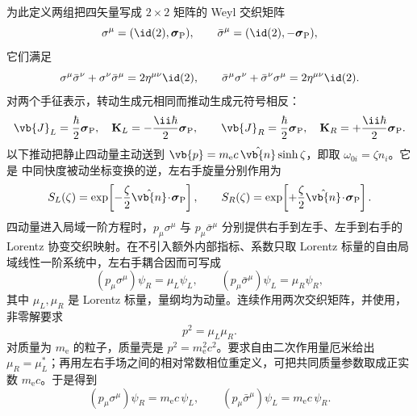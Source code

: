 为此定义两组把四矢量写成 $2\times2$ 矩阵的 Weyl 交织矩阵
\begin{equation*}
 \sigma^\mu=(\id(2),\boldsymbol\sigma_{\rm P}),
 \qquad
 \bar\sigma^\mu=(\id(2),-\boldsymbol\sigma_{\rm P}),
\end{equation*}
它们满足
\begin{equation}
 \sigma^\mu\bar\sigma^\nu+\sigma^\nu\bar\sigma^\mu
 =2\eta^{\mu\nu}\id(2),
 \qquad
 \bar\sigma^\mu\sigma^\nu+\bar\sigma^\nu\sigma^\mu
 =2\eta^{\mu\nu}\id(2).
 \label{eq:sigmabar-identity}
\end{equation}
对两个手征表示，转动生成元相同而推动生成元符号相反：
\begin{equation}
 \vb{J}_L=\frac{\hbar}{2}\boldsymbol\sigma_{\rm P},
 \quad
 \mathbf K_L=-\frac{\ii\hbar}{2}\boldsymbol\sigma_{\rm P},
 \qquad
 \vb{J}_R=\frac{\hbar}{2}\boldsymbol\sigma_{\rm P},
 \quad
 \mathbf K_R=+\frac{\ii\hbar}{2}\boldsymbol\sigma_{\rm P}.
 \label{eq:weyl-generators}
\end{equation}
以下推动把静止四动量主动送到 $\vb{p}=m_{\mathrm e}c\,\hat{\vb{n}}\sinh\zeta$，即取 $\omega_{0i}=\zeta n_i$。它是 中同快度被动坐标变换的逆，左右手旋量分别作用为
\begin{equation}
 S_L(\zeta)=\exp\!\left[-\frac{\zeta}{2}
 \hat{\vb{n}}\!\cdot\!\boldsymbol\sigma_{\rm P}\right],
 \qquad
 S_R(\zeta)=\exp\!\left[+\frac{\zeta}{2}
 \hat{\vb{n}}\!\cdot\!\boldsymbol\sigma_{\rm P}\right].
 \label{eq:weyl-boost-r7}
\end{equation}
四动量进入局域一阶方程时，$p_\mu\sigma^\mu$ 与 $p_\mu\bar\sigma^\mu$ 分别提供右手到左手、左手到右手的 Lorentz 协变交织映射。在不引入额外内部指标、系数只取 Lorentz 标量的自由局域线性一阶系统中，左右手耦合因而可写成
\begin{equation*}
 (p_\mu\sigma^\mu)\psi_R=\mu_L\psi_L,
 \qquad
 (p_\mu\bar\sigma^\mu)\psi_L=\mu_R\psi_R,
\end{equation*}
其中 $\mu_L,\mu_R$ 是 Lorentz 标量，量纲均为动量。连续作用两次交织矩阵，并使用，非零解要求
\begin{equation*}
 p^2=\mu_L\mu_R.
\end{equation*}
对质量为 $m_{\mathrm e}$ 的粒子，质量壳是 $p^2=m_{\mathrm e}^2c^2$。要求自由二次作用量厄米给出 $\mu_R=\mu_L^*$；再用左右手场之间的相对常数相位重定义，可把共同质量参数取成正实数 $m_{\mathrm e} c$。于是得到
\begin{equation}
 {
 (p_\mu\sigma^\mu)\psi_R=m_{\mathrm e} c\,\psi_L,
 \qquad
 (p_\mu\bar\sigma^\mu)\psi_L=m_{\mathrm e} c\,\psi_R.}
 \label{eq:massive-weyl-coupled-r7}
\end{equation}
